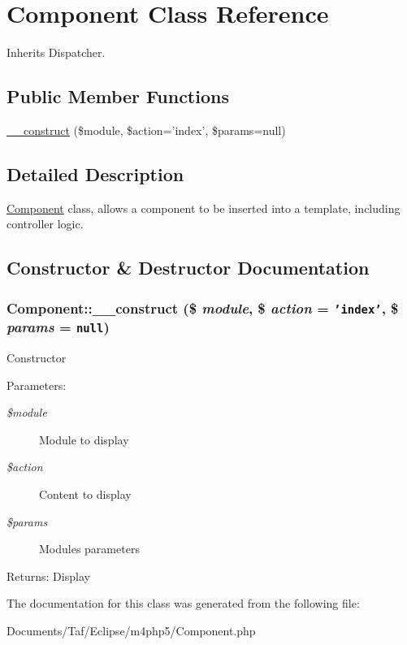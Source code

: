 \hypertarget{classComponent}{
\section{Component Class Reference}
\label{classComponent}
}
Inherits Dispatcher.

\subsection*{Public Member Functions}
\begin{CompactItemize}
\item 
\hyperlink{classComponent_941aa95779d197b421b80d79a689da80}{\_\-\_\-construct} (\$module, \$action='index', \$params=null)
\end{CompactItemize}


\subsection{Detailed Description}
\hyperlink{classComponent}{Component} class, allows a component to be inserted into a template, including controller logic. 

\subsection{Constructor \& Destructor Documentation}
\hypertarget{classComponent_941aa95779d197b421b80d79a689da80}{
\subsubsection[\_\-\_\-construct]{\setlength{\rightskip}{0pt plus 5cm}Component::\_\-\_\-construct (\$ {\em module}, \/  \$ {\em action} = {\tt 'index'}, \/  \$ {\em params} = {\tt null})}}
\label{classComponent_941aa95779d197b421b80d79a689da80}


Constructor

\begin{Desc}
\item[Parameters:]
\begin{description}
\item[{\em \$module}]Module to display \item[{\em \$action}]Content to display \item[{\em \$params}]Modules parameters \end{description}
\end{Desc}
\begin{Desc}
\item[Returns:]Display \end{Desc}


The documentation for this class was generated from the following file:\begin{CompactItemize}
\item 
Documents/Taf/Eclipse/m4php5/Component.php\end{CompactItemize}
